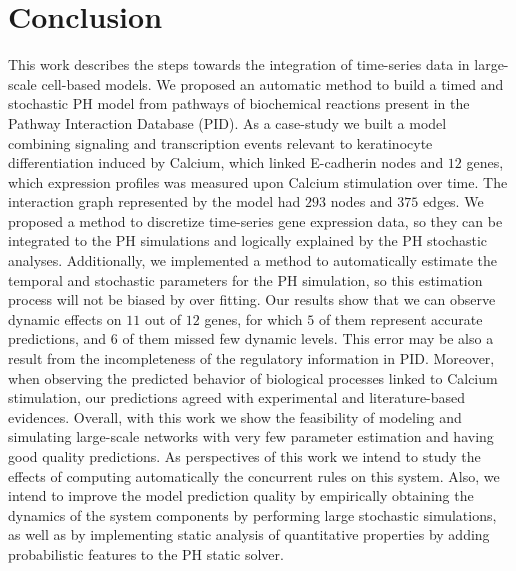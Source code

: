 \section{Conclusion}
This work describes the steps towards the integration of time-series data in large-scale cell-based models. 
We proposed an automatic method to build a timed and stochastic PH model from pathways of biochemical reactions present in 
the Pathway Interaction Database (PID). 
As a case-study we built a model combining signaling and transcription events relevant to keratinocyte differentiation induced by Calcium, which linked E-cadherin nodes and $12$ genes, which 
expression profiles was measured upon Calcium stimulation over time. The interaction graph represented by the model had $293$ nodes and $375$ edges.
We proposed a method to discretize time-series gene expression data, so they can be integrated to the PH simulations and logically explained by the PH stochastic analyses. 
Additionally, we implemented a method to automatically estimate the temporal and stochastic
parameters for the PH simulation, so this estimation process will not be biased by over fitting. 
Our results show that  we can observe dynamic effects on $11$ out of $12$ genes, for which $5$ of them represent accurate predictions, and $6$ of them missed few dynamic levels.
This error may be also a result from the incompleteness of the regulatory information in PID.
Moreover, when observing the predicted behavior of biological processes linked to Calcium stimulation, our predictions agreed with experimental and literature-based evidences.
Overall, with this work we show the feasibility of modeling and simulating large-scale networks with very few parameter estimation 
and having good quality predictions.
As perspectives of this work we intend to study the effects of computing automatically the concurrent rules on this system.
Also, we intend to improve the model prediction quality by empirically obtaining the dynamics of the system components by performing large stochastic simulations, as well 
as by implementing static analysis of quantitative properties by adding probabilistic features to the PH static solver.

